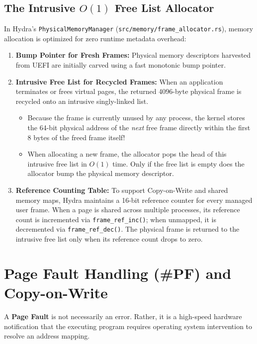 \subsection{The Intrusive $O(1)$ Free List Allocator}
In Hydra's \texttt{PhysicalMemoryManager} (\texttt{src/memory/frame\_allocator.rs}), memory allocation is optimized for zero runtime metadata overhead:
\begin{enumerate}
    \item \textbf{Bump Pointer for Fresh Frames:} Physical memory descriptors harvested from UEFI are initially carved using a fast monotonic bump pointer.
    \item \textbf{Intrusive Free List for Recycled Frames:} When an application terminates or frees virtual pages, the returned 4096-byte physical frame is recycled onto an intrusive singly-linked list.
    \begin{itemize}
        \item Because the frame is currently unused by any process, the kernel stores the 64-bit physical address of the \textit{next} free frame directly within the first 8 bytes of the freed frame itself!
        \item When allocating a new frame, the allocator pops the head of this intrusive free list in $O(1)$ time. Only if the free list is empty does the allocator bump the physical memory descriptor.
    \end{itemize}
    \item \textbf{Reference Counting Table:} To support Copy-on-Write and shared memory maps, Hydra maintains a 16-bit reference counter for every managed user frame. When a page is shared across multiple processes, its reference count is incremented via \texttt{frame\_ref\_inc()}; when unmapped, it is decremented via \texttt{frame\_ref\_dec()}. The physical frame is returned to the intrusive free list only when its reference count drops to zero.
\end{enumerate}

\section{Page Fault Handling (\#PF) and Copy-on-Write}
\label{sec:page_fault_handling}

A \textbf{Page Fault} is not necessarily an error. Rather, it is a high-speed hardware notification that the executing program requires operating system intervention to resolve an address mapping.

